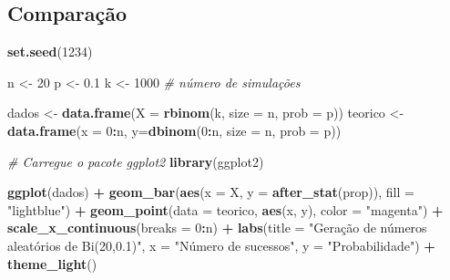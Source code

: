 \documentclass[
]{book}
\newenvironment{Shaded}{\begin{snugshade}}{\end{snugshade}}
\newcommand{\AttributeTok}[1]{\textcolor[rgb]{0.13,0.29,0.53}{#1}}
\newcommand{\CommentTok}[1]{\textcolor[rgb]{0.56,0.35,0.01}{\textit{#1}}}
\newcommand{\DecValTok}[1]{\textcolor[rgb]{0.00,0.00,0.81}{#1}}
\newcommand{\FloatTok}[1]{\textcolor[rgb]{0.00,0.00,0.81}{#1}}
\newcommand{\FunctionTok}[1]{\textcolor[rgb]{0.13,0.29,0.53}{\textbf{#1}}}
\newcommand{\NormalTok}[1]{#1}
\newcommand{\OtherTok}[1]{\textcolor[rgb]{0.56,0.35,0.01}{#1}}
\newcommand{\SpecialCharTok}[1]{\textcolor[rgb]{0.81,0.36,0.00}{\textbf{#1}}}
\newcommand{\StringTok}[1]{\textcolor[rgb]{0.31,0.60,0.02}{#1}}
\begin{document}
\subsection{Comparação}\label{comparauxe7uxe3o-4}

\begin{Shaded}
\begin{Highlighting}[]
\FunctionTok{set.seed}\NormalTok{(}\DecValTok{1234}\NormalTok{)}

\NormalTok{n }\OtherTok{\textless{}{-}} \DecValTok{20}
\NormalTok{p }\OtherTok{\textless{}{-}} \FloatTok{0.1}
\NormalTok{k }\OtherTok{\textless{}{-}} \DecValTok{1000} \CommentTok{\# número de simulações}

\NormalTok{dados }\OtherTok{\textless{}{-}} \FunctionTok{data.frame}\NormalTok{(}\AttributeTok{X =} \FunctionTok{rbinom}\NormalTok{(k, }\AttributeTok{size =}\NormalTok{ n, }\AttributeTok{prob =}\NormalTok{ p))}
\NormalTok{teorico }\OtherTok{\textless{}{-}} \FunctionTok{data.frame}\NormalTok{(}\AttributeTok{x =} \DecValTok{0}\SpecialCharTok{:}\NormalTok{n, }\AttributeTok{y=}\FunctionTok{dbinom}\NormalTok{(}\DecValTok{0}\SpecialCharTok{:}\NormalTok{n, }\AttributeTok{size =}\NormalTok{ n, }\AttributeTok{prob =}\NormalTok{ p))}

\CommentTok{\# Carregue o pacote ggplot2}
\FunctionTok{library}\NormalTok{(ggplot2)}

\FunctionTok{ggplot}\NormalTok{(dados) }\SpecialCharTok{+}  
  \FunctionTok{geom\_bar}\NormalTok{(}\FunctionTok{aes}\NormalTok{(}\AttributeTok{x =}\NormalTok{ X, }\AttributeTok{y =} \FunctionTok{after\_stat}\NormalTok{(prop)), }\AttributeTok{fill =} \StringTok{"lightblue"}\NormalTok{) }\SpecialCharTok{+} 
  \FunctionTok{geom\_point}\NormalTok{(}\AttributeTok{data =}\NormalTok{ teorico, }\FunctionTok{aes}\NormalTok{(x, y), }\AttributeTok{color =} \StringTok{"magenta"}\NormalTok{) }\SpecialCharTok{+} 
  \FunctionTok{scale\_x\_continuous}\NormalTok{(}\AttributeTok{breaks =} \DecValTok{0}\SpecialCharTok{:}\NormalTok{n) }\SpecialCharTok{+}  
  \FunctionTok{labs}\NormalTok{(}\AttributeTok{title =} \StringTok{"Geração de números aleatórios de Bi(20,0.1)"}\NormalTok{, }\AttributeTok{x =} \StringTok{"Número de sucessos"}\NormalTok{,       }
  \AttributeTok{y =} \StringTok{"Probabilidade"}\NormalTok{) }\SpecialCharTok{+}  
  \FunctionTok{theme\_light}\NormalTok{()}
\end{Highlighting}
\end{Shaded}
\end{document}
